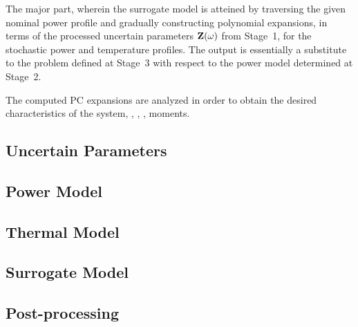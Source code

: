  The major part, wherein the surrogate model is atteined by traversing the given nominal power profile and gradually constructing polynomial expansions, in terms of the processed uncertain parameters $\mathbf{Z}(\omega)$ from Stage~1, for the stochastic power and temperature profiles. The output is essentially a substitute to the problem defined at Stage~3 with respect to the power model determined at Stage~2.

 The computed PC expansions are analyzed in order to obtain the desired characteristics of the system, \eg, \cdfs, \pdfs, moments.

\subsection{Uncertain Parameters} 


\subsection{Power Model} 


\subsection{Thermal Model} 


\subsection{Surrogate Model} 


\subsection{Post-processing} 

